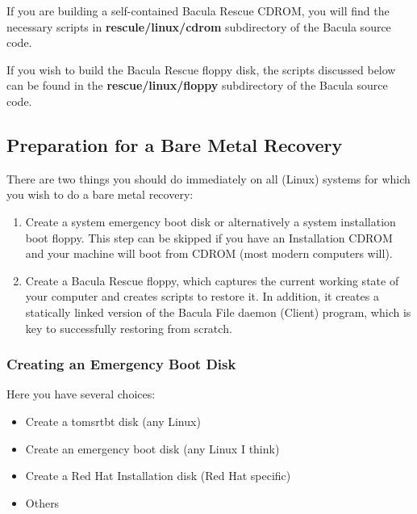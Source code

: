 If you are building a self-contained Bacula Rescue CDROM, you will find the
necessary scripts in {\bf rescule/linux/cdrom} subdirectory of the Bacula
source code. 

If you wish to build the Bacula Rescue floppy disk, the scripts discussed
below can be found in the {\bf rescue/linux/floppy} subdirectory of the Bacula
source code. 

\subsection*{Preparation for a Bare Metal Recovery}

There are two things you should do immediately on all (Linux) systems for
which you wish to do a bare metal recovery: 

\begin{enumerate}
\item Create a system emergency boot disk or alternatively  a system
   installation boot floppy. This step can be skipped  if you have an
   Installation CDROM and your machine will boot  from CDROM (most modern
computers will).  
\item Create a Bacula Rescue floppy, which captures the current working  state
   of your computer and creates scripts to restore it. In  addition, it creates a
   statically linked version of the Bacula  File daemon (Client) program, which
is key to successfully restoring  from scratch. 
\end{enumerate}

\subsubsection*{Creating an Emergency Boot Disk}

Here you have several choices: 

\begin{itemize}
\item Create a tomsrtbt disk (any Linux)  
\item Create an emergency boot disk (any Linux I think) 
\item Create a Red Hat Installation disk (Red Hat specific)  
\item Others 
   \end{itemize}

